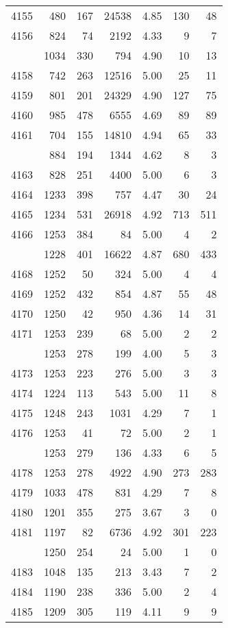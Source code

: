 \documentclass[
]{article}
\begin{document}
\begin{table}
\begin{tabular}[t]{lrrrrrr}
4155 & 480 & 167 & 24538 & 4.85 & 130 & 48\\
4156 & 824 & 74 & 2192 & 4.33 & 9 & 7\\
\addlinespace
4157 & 1034 & 330 & 794 & 4.90 & 10 & 13\\
4158 & 742 & 263 & 12516 & 5.00 & 25 & 11\\
4159 & 801 & 201 & 24329 & 4.90 & 127 & 75\\
4160 & 985 & 478 & 6555 & 4.69 & 89 & 89\\
4161 & 704 & 155 & 14810 & 4.94 & 65 & 33\\
\addlinespace
4162 & 884 & 194 & 1344 & 4.62 & 8 & 3\\
4163 & 828 & 251 & 4400 & 5.00 & 6 & 3\\
4164 & 1233 & 398 & 757 & 4.47 & 30 & 24\\
4165 & 1234 & 531 & 26918 & 4.92 & 713 & 511\\
4166 & 1253 & 384 & 84 & 5.00 & 4 & 2\\
\addlinespace
4167 & 1228 & 401 & 16622 & 4.87 & 680 & 433\\
4168 & 1252 & 50 & 324 & 5.00 & 4 & 4\\
4169 & 1252 & 432 & 854 & 4.87 & 55 & 48\\
4170 & 1250 & 42 & 950 & 4.36 & 14 & 31\\
4171 & 1253 & 239 & 68 & 5.00 & 2 & 2\\
\addlinespace
4172 & 1253 & 278 & 199 & 4.00 & 5 & 3\\
4173 & 1253 & 223 & 276 & 5.00 & 3 & 3\\
4174 & 1224 & 113 & 543 & 5.00 & 11 & 8\\
4175 & 1248 & 243 & 1031 & 4.29 & 7 & 1\\
4176 & 1253 & 41 & 72 & 5.00 & 2 & 1\\
\addlinespace
4177 & 1253 & 279 & 136 & 4.33 & 6 & 5\\
4178 & 1253 & 278 & 4922 & 4.90 & 273 & 283\\
4179 & 1033 & 478 & 831 & 4.29 & 7 & 8\\
4180 & 1201 & 355 & 275 & 3.67 & 3 & 0\\
4181 & 1197 & 82 & 6736 & 4.92 & 301 & 223\\
\addlinespace
4182 & 1250 & 254 & 24 & 5.00 & 1 & 0\\
4183 & 1048 & 135 & 213 & 3.43 & 7 & 2\\
4184 & 1190 & 238 & 336 & 5.00 & 2 & 4\\
4185 & 1209 & 305 & 119 & 4.11 & 9 & 9\\

\end{tabular}
\end{table}
\end{document}
